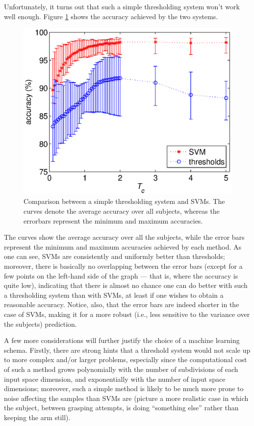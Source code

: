 \documentclass[a4paper,10pt,conference]{ieeeconf}
\begin{document}
Unfortunately, it turns out that such a simple thresholding system
won't work well enough. Figure \ref{fig:comparison} shows the accuracy
achieved by the two systems.

\begin{figure}[htbp]
  \begin{center}
    \includegraphics[width=\linewidth]{comparison.eps}
    \caption{Comparison between a simple thresholding system and
    SVMs. The curves denote the average accuracy over all subjects,
    whereas the errorbars represent the minimum and maximum
    accuracies.}
    \label{fig:comparison}
  \end{center}
\end{figure}

The curves show the average accuracy over all the subjects, while the
error bars represent the minimum and maximum accuracies achieved by
each method. As one can see, SVMs are consistently and uniformly
better than thresholds; moreover, there is basically no overlapping
between the error bars (except for a few points on the left-hand side
of the graph --- that is, where the accuracy is quite low), indicating
that there is almost no chance one can do better with such a
thresholding system than with SVMs, at least if one wishes to obtain a
reasonable accuracy. Notice, also, that the error bars are indeed
shorter in the case of SVMs, making it for a more robust (i.e., less
sensitive to the variance over the subjects) prediction.

A few more considerations will further justify the choice of a machine
learning schema. Firstly, there are strong hints that a threshold
system would not scale up to more complex and/or larger problems,
especially since the computational cost of such a method grows
polynomially with the number of subdivisions of each input space
dimension, and exponentially with the number of input space
dimensions; moreover, such a simple method is likely to be much more
prone to noise affecting the samples than SVMs are (picture a more
realistic case in which the subject, between grasping attempts, is doing
``something else'' rather than keeping the arm still).
\end{document}

